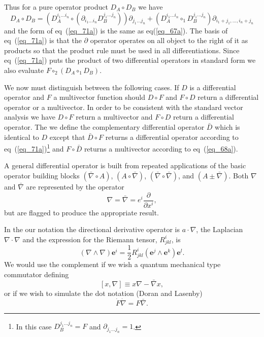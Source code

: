 \documentclass[12pt]{report}
\newcommand{\bm}[1]{\boldsymbol{#1}}
\newcommand{\bfrac}[2]{\displaystyle\frac{#1}{#2}}
\newcommand{\lp}{\left (}
\newcommand{\rp}{\right )}
\newcommand{\half}{\frac{1}{2}}
\newcommand{\pdiff}[2]{\bfrac{\partial {#1}}{\partial {#2}}}
\newcommand{\W}{\wedge}
\newcommand{\lbrk}{\left [}
\newcommand{\rbrk}{\right ]}
\newcommand{\com}[1]{\lbrk {#1} \rbrk}
\newcommand{\paren}[1]{\lp {#1} \rp}
\newcommand{\be}{\begin{equation}}
\newcommand{\ee}{\end{equation}}
\newcommand{\eb}{\bm{e}}
\begin{document}
Thus for a pure operator product $D_{A}\circ D_{B}$ we have
\be\label{eq_71a}
    D_{A}\circ D_{B} = \paren{D_{A}^{i_{1}\dots i_{n}}\circ\paren{\partial_{i_{1}\dots i_{n}}D_{B}^{j_{1}\dots j_{n}}}}
                                             \partial_{j_{1}\dots j_{n}}+
                                             \paren{D_{A}^{i_{1}\dots i_{n}}\circ_{1}D_{B}^{j_{1}\dots j_{n}}}
                                             \partial_{i_{1}+j_{1},\dots, i_{n}+j_{n}}
\ee
and the form of eq~(\ref{eq_71a}) is the same as eq(\ref{eq_67a}).  The basis of eq~(\ref{eq_71a}) is that the $\partial$ operator
operates on all object to the right of it as products so that the product rule must be used in all differentiations.  Since eq~(\ref{eq_71a})
puts the product of two differential operators in standard form we also evaluate $F\circ_{2}\paren{D_{A}\circ_{1}D_{B}}$.

We now must distinguish between the following cases.  If $D$ is a differential operator and $F$ a multivector function should $D\circ F$ and
$F\circ D$ return a differential operator or a multivector. In order to be consistent with the standard vector analysis we have $D\circ F$
return a multivector and $F\circ D$ return a differential operator.  The we define the complementary differential operator $\bar{D}$ which
is identical to $D$ except that $\bar{D}\circ F$ returns a differential operator according to eq~(\ref{eq_71a})\footnote{In this case
$D_{B}^{j_{1}\dots j_{n}} = F$ and $\partial_{j_{1}\dots j_{n}} = 1$.} and $F\circ\bar{D}$ returns a multivector according to eq~(\ref{eq_68a}).

A general differential operator is built from repeated applications of the basic operator building blocks $\paren{\bar{\nabla}\circ A}$,
$\paren{A\circ\bar{\nabla}}$, $\paren{\bar{\nabla}\circ\bar{\nabla}}$, and $\paren{A\pm \bar{\nabla}}$.  Both $\nabla$ and  $\bar{\nabla}$
are represented by the operator
\be
    \nabla = \bar{\nabla} = e^{i}\pdiff{}{x^{i}},
\ee
but are flagged to produce the appropriate result.

In the our notation the directional derivative operator is $a\cdot\nabla$, the Laplacian
$\nabla\cdot\nabla$ and the expression for the Riemann tensor, $R^{i}_{jkl}$, is
\be
    \paren{\nabla\W\nabla}\eb^{i} = \half R^{i}_{jkl}\paren{\eb^{j}\W\eb^{k}}\eb^{l}.
\ee
We would use the complement if we wish a quantum mechanical type commutator defining
\be
    \com{x,\nabla} \equiv x\nabla - \bar{\nabla}x,
\ee
or if we wish to simulate the dot notation (Doran and Lasenby)
\be
    \dot{F}\dot{\nabla} = F\bar{\nabla}.
\ee
\end{document}
